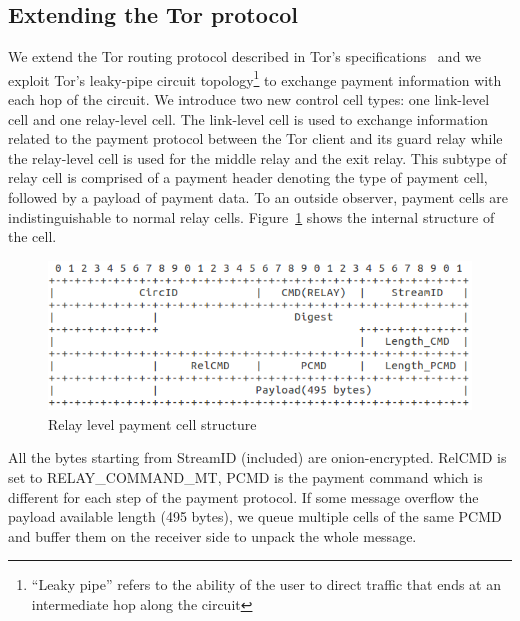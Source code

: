 
\subsection{Extending the Tor protocol}

We extend the Tor routing protocol described in Tor's
specifications~\cite{dingledine2018tor} and we exploit Tor's leaky-pipe circuit
topology\footnote{``Leaky pipe'' refers to the ability of the user to direct
  traffic that ends at an intermediate hop along the circuit} to exchange
payment information with each hop of the circuit. We introduce two new control
cell types: one link-level cell and one relay-level cell. The link-level cell is
used to exchange information related to the payment protocol between the Tor
client and its guard relay while the relay-level cell is used for the middle
relay and the exit relay. This subtype of relay cell is comprised of a payment
header denoting the type of payment cell, followed by a payload of payment
data. To an outside observer, payment cells are indistinguishable to normal
relay cells. Figure~\ref{fig:relay_command_mt_structure} shows the internal structure of the cell.
\begin{figure}[h]
    \centering
    \includegraphics[scale=0.38]{images/payment_cell_header.png}
    \caption{Relay level payment cell structure}
\label{fig:relay_command_mt_structure}
\end{figure}

All the bytes starting from StreamID (included) are onion-encrypted. RelCMD is set to RELAY\_COMMAND\_MT, PCMD is the payment command which is different for each step of the payment protocol. If some message overflow the payload available length (495 bytes), we queue multiple cells of the same PCMD and buffer them on the receiver side to unpack the whole message.

